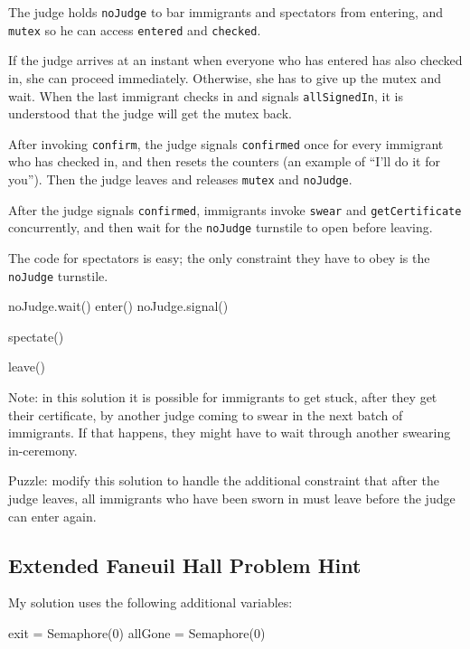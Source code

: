 \documentclass{book}
\begin{document}
The judge holds {\tt noJudge} to bar immigrants and spectators
from entering, and {\tt mutex} so he can access {\tt entered}
and {\tt checked}.

If the judge arrives at an instant when everyone who has
entered has also checked in, she can proceed immediately.  Otherwise,
she has to give up the mutex and wait.  When the last immigrant
checks in and signals {\tt allSignedIn}, it is understood that the
judge will get the mutex back.

After invoking {\tt confirm}, the judge signals {\tt confirmed}
once for every immigrant who has checked in, and then resets
the counters (an example of ``I'll do it for you'').
Then the judge leaves and releases {\tt mutex} and {\tt noJudge}.

After the judge signals {\tt confirmed}, immigrants invoke
    {\tt swear} and {\tt getCertificate} concurrently, and then
wait for the {\tt noJudge} turnstile to open before leaving.

The code for spectators is easy; the only constraint they have
to obey is the {\tt noJudge} turnstile.

\begin{unbreakable}[title={Faneuil Hall problem solution (spectator)}]{}
noJudge.wait()
enter()
noJudge.signal()

spectate()

leave()
\end{unbreakable}

Note: in this solution it is possible for immigrants to get stuck,
after they get their certificate, by another judge coming to swear
in the next batch of immigrants.  If that happens, they might have
to wait through another swearing in-ceremony.

Puzzle: modify this solution to handle the additional constraint
that after the judge leaves, all immigrants who have been sworn
in must leave before the judge can enter again.



\subsection {Extended Faneuil Hall Problem Hint}

My solution uses the following additional variables:

\begin{unbreakable}[title={Faneuil Hall problem hint}]{}
exit = Semaphore(0)
allGone = Semaphore(0)
\end{unbreakable}
\end{document}
